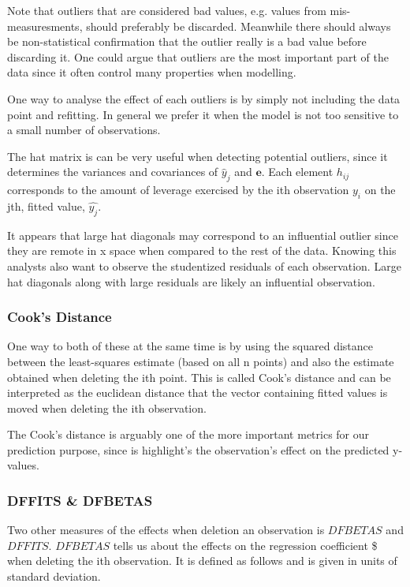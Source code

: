 \documentclass[11pt]{article}
\begin{document}
Note that outliers that are considered bad values, e.g. values from mis-measuresments,
should preferably be discarded. Meanwhile there should
always be non-statistical confirmation that the outlier really is a bad value before discarding it. One
could argue that outliers are the most important part of the data since it often control many 
properties when modelling. 

One way to analyse the effect of each outliers is by simply not including the data point and refitting.
In general we prefer it when the model is not too sensitive to a small number of observations. 

The hat matrix is can be very useful when detecting potential outliers, since it determines the variances
and covariances of \(\hat{y}_j\) and \(\textbf{e}\). Each element \(h_{ij}\) corresponds to the amount of
leverage exercised by the ith observation \(y_i\) on the jth, fitted value, \(\hat{y_j}\).

It appears that large hat diagonals may correspond to an influential outlier since they are remote
in x space when compared to the rest of the data. Knowing this analysts also want to observe
the studentized residuals of each observation. Large hat diagonals along with large residuals 
are likely an influential observation. 

\subsubsection{Cook's Distance}
\label{sec:org1d22420}

One way to both of these at the same time is by using the squared distance between the least-squares
estimate (based on all n points) and also the estimate obtained when deleting the ith point. This is
called Cook’s distance and can be interpreted as the euclidean distance that the vector containing fitted
values is moved when deleting the ith observation. 

The Cook's distance is arguably one of the more important metrics for our prediction purpose, since is highlight's
the observation's effect on the predicted y-values. \cite{22286}

\subsubsection{DFFITS \& DFBETAS}
\label{sec:org488bb2e}

Two other measures of the effects when deletion an observation is \(DFBETAS\) and \(DFFITS\). \(DFBETAS\) tells us
about the effects on the regression coefficient \$ when deleting the ith observation. It is defined as
follows and is given in units of standard deviation.
\end{document}
